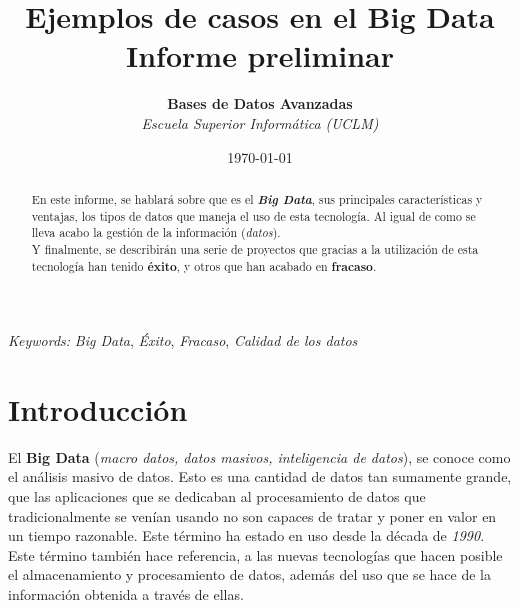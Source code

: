 \documentclass[11pt]{diazessay} %
\title{\textbf{Ejemplos de casos en el Big Data \\ Informe preliminar}} %
\author{\textbf{Bases de Datos Avanzadas} \\ \textit{Escuela Superior Informática (UCLM)}} %
\date{\today} %
\begin{document}
\maketitle %




\begin{abstract}
	
En este informe, se hablará sobre que es el \textbf{\textit{Big Data}}, sus principales características y ventajas, los tipos de datos que maneja el uso de esta tecnología. Al igual de como se lleva acabo la gestión de la información (\textit{datos}).\\

Y finalmente, se describirán una serie de proyectos que gracias a la utilización de esta tecnología han tenido \textbf{éxito}, y otros que han acabado en \textbf{fracaso}.
\end{abstract}

\hspace*{3.6mm}\textit{Keywords:} \textit{Big Data}, \textit{Éxito}, \textit{Fracaso}, \textit{Calidad de los datos}

\vspace{20pt} %

\newpage
\section*{Introducción}

El \textbf{Big Data} (\textit{macro datos, datos masivos, inteligencia de datos}), se conoce como el análisis masivo de datos. Esto es una cantidad de datos tan sumamente grande, que las aplicaciones que se dedicaban al  procesamiento de datos que tradicionalmente se venían usando no son capaces de tratar y poner en valor en un tiempo razonable. Este  término ha estado en uso desde la década de \textit{1990}.\\
Este término también hace referencia, a las nuevas tecnologías que hacen posible el almacenamiento y procesamiento de datos, además del uso que se hace de la información obtenida a través de ellas.\\
\end{document}
